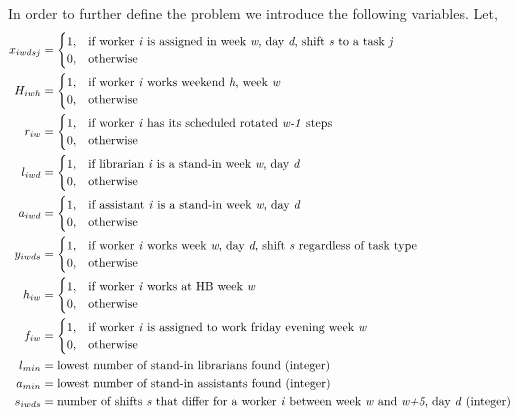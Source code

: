 In order to further define the problem we introduce the following variables. Let,
\begin{align}
    x_{iwdsj}&=
    \begin{cases}
      1, & \text{if worker \textit{i} is assigned in week \textit{w}, day \textit{d}, shift \textit{s} to a task \textit{j}}\\
      0, & \text{otherwise}
    \end{cases}
    \\
    H_{iwh}&=
    \begin{cases}
      1, & \text{if worker \textit{i} works weekend \textit{h}, week \textit{w}}\\
      0, & \text{otherwise}
    \end{cases}
	\\
	r_{iw}&=
	\begin{cases}
		1, & \text{if worker \textit{i} has its scheduled rotated \textit{w-1} steps}\\
		0, & \text{otherwise}
	\end{cases}
	\\
	l_{iwd}&=
	\begin{cases}
	  1, & \text{if librarian \textit{i} is a stand-in week \textit{w}, day \textit{d}} \\
	  0, & \text{otherwise}
	\end{cases}
	\\
	a_{iwd}&=
	\begin{cases}
 		1, & \text{if assistant \textit{i} is a stand-in week \textit{w}, day \textit{d}} \\
 		0, & \text{otherwise}
	\end{cases}
	\\
	y_{iwds}&=
	\begin{cases}
 		1, & \text{if worker \textit{i} works week \textit{w}, day \textit{d}, shift \textit{s} regardless of task type} \\
 		0, & \text{otherwise}
	\end{cases}
	\\
	h_{iw}&=
	\begin{cases}
 		1, & \text{if worker \textit{i} works at HB week \textit{w}} \\
 		0, & \text{otherwise}
	\end{cases}
	\\
	f_{iw}&=
	\begin{cases}
 		1, & \text{if worker \textit{i} is assigned to work friday evening week \textit{w}} \\
 		0, & \text{otherwise}
	\end{cases}	
	\\
	l_{min}&= \text{lowest number of stand-in librarians found (integer)} \\
	a_{min}&= \text{lowest number of stand-in assistants found (integer)} \\
	s_{iwds}&= \text{number of shifts \textit{s} that differ for a worker \textit{i} between week \textit{w} and \textit{w+5}, day \textit{d} (integer)}
\end{align}

